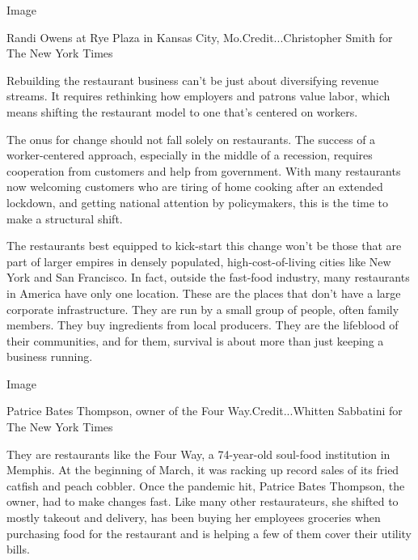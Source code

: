 Image

Randi Owens at Rye Plaza in Kansas City, Mo.Credit...Christopher Smith
for The New York Times

Rebuilding the restaurant business can't be just about diversifying
revenue streams. It requires rethinking how employers and patrons value
labor, which means shifting the restaurant model to one that's centered
on workers.

The onus for change should not fall solely on restaurants. The success
of a worker-centered approach, especially in the middle of a recession,
requires cooperation from customers and help from government. With many
restaurants now welcoming customers who are tiring of home cooking after
an extended lockdown, and getting national attention by policymakers,
this is the time to make a structural shift.

The restaurants best equipped to kick-start this change won't be those
that are part of larger empires in densely populated,
high-cost-of-living cities like New York and San Francisco. In fact,
outside the fast-food industry, many restaurants in America have only
one location. These are the places that don't have a large corporate
infrastructure. They are run by a small group of people, often family
members. They buy ingredients from local producers. They are the
lifeblood of their communities, and for them, survival is about more
than just keeping a business running.

Image

Patrice Bates Thompson, owner of the Four Way.Credit...Whitten Sabbatini
for The New York Times

They are restaurants like the Four Way, a 74-year-old soul-food
institution in Memphis. At the beginning of March, it was racking up
record sales of its fried catfish and peach cobbler. Once the pandemic
hit, Patrice Bates Thompson, the owner, had to make changes fast. Like
many other restaurateurs, she shifted to mostly takeout and delivery,
has been buying her employees groceries when purchasing food for the
restaurant and is helping a few of them cover their utility bills.

